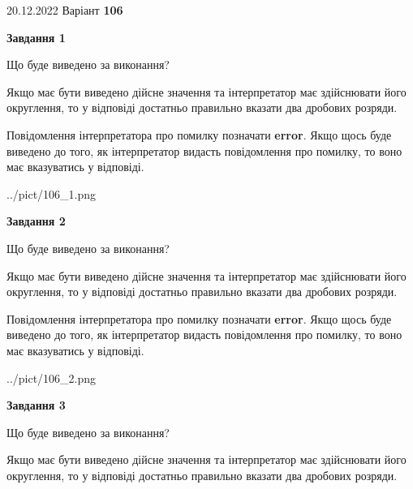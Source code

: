 \documentclass[12pt, ukrainian]{article}
\begin{document}
{20.12.2022 Варіант \No \textbf { 106 }\par}
{
\begin {Large}

{\begin {center}\textbf{Завдання 1}\end {center}}\par
Що буде виведено за виконання? \par

Якщо має бути виведено дійсне значення та інтерпретатор має здійснювати його округлення, 
то у відповіді достатньо правильно вказати два дробових розряди.

Повідомлення інтерпретатора про помилку позначати \textbf{error}.
Якщо щось буде виведено до того, як інтерпретатор видасть повідомлення про помилку, 
то воно має вказуватись у відповіді. \par

\begin{center}
	{../pict/106_1.png}
\end{center}
\newpage

{\begin {center}\textbf{Завдання 2}\end {center}}\par
Що буде виведено за виконання? \par

Якщо має бути виведено дійсне значення та інтерпретатор має здійснювати його округлення, 
то у відповіді достатньо правильно вказати два дробових розряди.

Повідомлення інтерпретатора про помилку позначати \textbf{error}.
Якщо щось буде виведено до того, як інтерпретатор видасть повідомлення про помилку, 
то воно має вказуватись у відповіді. \par

\begin{center}
	{../pict/106_2.png}
\end{center}
\newpage

{\begin {center}\textbf{Завдання 3}\end {center}}\par
Що буде виведено за виконання? \par

Якщо має бути виведено дійсне значення та інтерпретатор має здійснювати його округлення, 
то у відповіді достатньо правильно вказати два дробових розряди.


\end{Large}}
\end{document}
